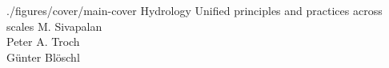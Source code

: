 \documentclass[10pt,twoside,twocolumn,openany]{book}
\begin{document}
\makebookcover
  {./figures/cover/main-cover}
  {Hydrology}
  {Unified principles and practices across scales}
  {M. Sivapalan \\ Peter A. Troch \\ Günter Blöschl}



\makecolophon{}

\pagestyle{empty}
\tableofcontents

\pagestyle{bookheader}
















\end{document}

